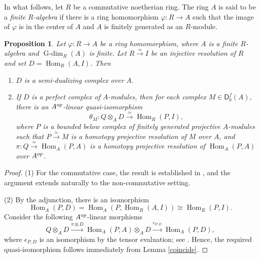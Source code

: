 \documentclass{amsart}
\DeclareMathOperator{\h}{H}
\newcommand{\D}{\mathsf{D}}
\newcommand{\0}{{\bf{0}}}
\DeclareMathOperator{\Gdim}{G-dim}
\DeclareMathOperator{\Hom}{Hom}
\newtheorem{proposition}[theorem]{Proposition}
\theoremstyle{definition}
\begin{document}
In what follows, let $R$ be a commutative noetherian ring. The ring $A$ is said to be a {\em finite $R$-algebra} if there is a ring homomorphism $\varphi\colon R\rightarrow A$ such that the image of $\varphi$ is in the center of $A$ and $A$ is finitely generated as an $R$-module.


\begin{proposition}\label{theta}
Let $\varphi\colon R\rightarrow A$ be a ring homomorphism, where $A$ is a finite $R$-algebra and $\Gdim_R(A)$ is finite. Let $R\xrightarrow \simeq I$ be an injective resolution of $R$ and set $D=\Hom_R(A,I)$. Then
\begin{enumerate}
\item $D$ is a semi-dualizing complex over $A$.

\item If $D$ is a perfect complex of  $A$-modules, then for each complex $M\in \D^f_b(A)$,
there is an $A^{\rm op}$-linear quasi-isomorphism
$$\theta_M\colon  Q\otimes_A D\xrightarrow \simeq \Hom_R(P,I),$$
where $P$ is a bounded below complex of finitely generated projective $A$-modules such that $P\xrightarrow \simeq M$ is a homotopy projective resolution of $M$ over $A$, and $\pi\colon Q\xrightarrow \simeq \Hom_A(P,A)$ is a homotopy projective resolution of $\Hom_A(P,A)$ over $A^{\rm op}$.
\end{enumerate}
\end{proposition}

\begin{proof}
(1) For the commutative case, the result is established in \cite[Theorem 6.1]{Chr01}, and the argument extends naturally to the non-commutative setting.

(2) By the adjunction, there is an isomorphism
$$\Hom_A(P,D)= \Hom_A(P, \Hom_R(A, I)) \cong \Hom_R(P, I).$$
Consider the following  $A^{\rm op}$-linear morphisms
$$ Q\otimes_A D  \xrightarrow {\pi\otimes D} \Hom_A(P,A)\otimes_A D\xrightarrow {\epsilon_{P,D}}\Hom_A(P,D),$$
where $\epsilon_{P,D}$ is an isomorphism by the tensor evaluation; see \cite[Theorem 4.5.10]{CFH}. Hence, the required quasi-isomorphism follows immediately from Lemma \ref{coincide}.
\end{proof}
\end{document}
